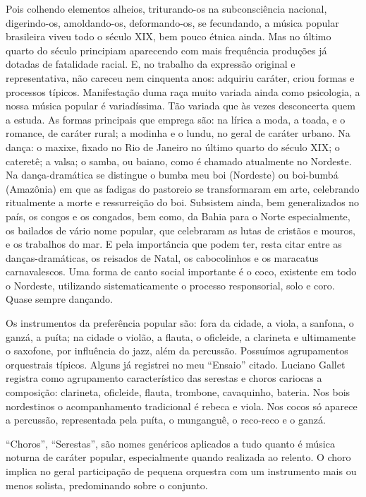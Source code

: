 Pois colhendo elementos alheios, triturando-os na subconsciência
nacional, digerindo-os, amoldando-os, deformando-os, se fecundando, a
música popular brasileira viveu todo o século XIX, bem pouco étnica
ainda. Mas no último quarto do século principiam aparecendo com mais
frequência produções já dotadas de fatalidade racial. E, no trabalho da
expressão original e representativa, não careceu nem cinquenta anos:
adquiriu caráter, criou formas e processos típicos. Manifestação duma
raça muito variada ainda como psicologia, a nossa música popular é
variadíssima. Tão variada que às vezes desconcerta quem a estuda. As
formas principais que emprega são: na lírica a moda, a toada, e o
romance, de caráter rural; a modinha e o lundu, no geral de caráter
urbano. Na dança: o maxixe, fixado no Rio de Janeiro no último quarto do
século XIX; o cateretê; a valsa; o samba, ou baiano, como é chamado
atualmente no Nordeste. Na dança-dramática se distingue o bumba meu boi
(Nordeste) ou boi-bumbá (Amazônia) em que as fadigas do pastoreio se
transformaram em arte, celebrando ritualmente a morte e ressurreição do
boi. Subsistem ainda, bem generalizados no país, os congos e os
congados, bem como, da Bahia para o Norte especialmente, os bailados de
vário nome popular, que celebraram as lutas de cristãos e mouros, e os
trabalhos do mar. E pela importância que podem ter, resta citar entre as
danças-dramáticas, os reisados de Natal, os cabocolinhos e os maracatus
carnavalescos. Uma forma de canto social importante é o coco, existente
em todo o Nordeste, utilizando sistematicamente o processo responsorial,
solo e coro. Quase sempre dançando.

Os instrumentos da preferência popular são: fora da cidade, a viola, a
sanfona, o ganzá, a puíta; na cidade o violão, a flauta, o oficleide, a
clarineta e ultimamente o saxofone, por influência do jazz, além da
percussão. Possuímos agrupamentos orquestrais típicos. Alguns já
registrei no meu ``Ensaio'' citado. Luciano Gallet registra como
agrupamento característico das serestas e choros cariocas a composição:
clarineta, oficleide, flauta, trombone, cavaquinho, bateria. Nos bois
nordestinos o acompanhamento tradicional é rebeca e viola. Nos cocos só
aparece a percussão, representada pela puíta, o munganguê, o reco-reco e
o ganzá.

``Choros'', ``Serestas'', são nomes genéricos aplicados a tudo quanto é
música noturna de caráter popular, especialmente quando realizada ao
relento. O choro implica no geral participação de pequena orquestra com
um instrumento mais ou menos solista, predominando sobre o conjunto.

